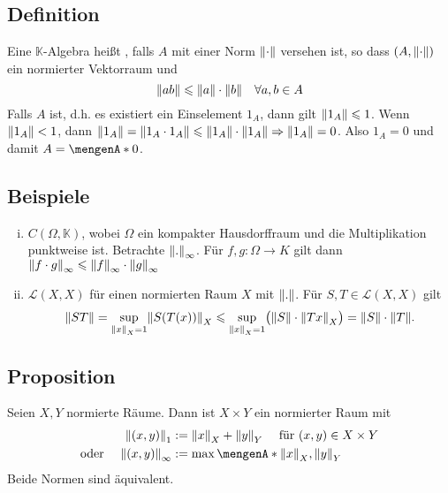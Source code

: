 \subsection[Definition: Normierte $\mathds{K}$-Algebra]{Definition} %
\label{sub:210}
Eine $\mathds{K}$-Algebra heißt , falls $A$ mit einer Norm $\norm{\cdot}$ versehen ist, so dass $(A,\norm{\cdot} )$ ein normierter Vektorraum und
\[
	\norm{a b} \le \norm{a} \cdot \norm{b} \quad \forall a,b \in A   
\]
Falls $A$  ist, d.h. es existiert ein Einselement $1_A$, dann gilt $\norm{1_A} \le 1$.
Wenn $\norm{1_A} < 1$, dann $\norm{1_A} = \norm{1_A \cdot 1_A} \le \norm{1_A} \cdot \norm{1_A} \Rightarrow \norm{1_A} =0 $. Also $1_A=0$ und damit $A= \set{0}$.

\subsection[Beispiele für normierte Algebren]{Beispiele} %
\label{sub:211}
\begin{enumerate}[(i)]
	\item $C(\Omega,\mathds{K})$, wobei $\Omega$ ein kompakter Hausdorffraum und die Multiplikation punktweise ist. Betrachte $\norm[\infty]{.}$. Für $f,g : \Omega \to K$ gilt dann
	$\norm[\infty]{f \cdot g} \le \norm[\infty]{f} \cdot \norm[\infty]{g}$
	\item $\mathcal{L}(X,X)$ für einen normierten Raum $X$ mit $\norm{.}$. Für $S,T \in \mathcal{L}(X,X)$ gilt
	\[
		\norm{S T} = \sup_{\norm[X]{x}=1} \norm[X]{S(T(x))} \le \sup_{\norm[X]{x}=1} \enbrace[\big]{\norm{S} \cdot \norm[X]{Tx}} = \norm{S} \cdot \norm{T}.     
	\]
\end{enumerate}

\subsection[Proposition: Norm auf dem Produkt normierter Räume]{Proposition} %
\label{sub:212}
Seien $X,Y$ normierte Räume. Dann ist $X \times Y$ ein normierter Raum mit 
\begin{align*}
	 \norm[1]{(x,y)} &:= \norm[X]{x} + \norm[Y]{y}   \quad \text{ für } (x,y) \in X \times Y \\
	\text{oder } \quad \norm[\infty]{(x,y)} &:= \max \set{\norm[X]{x}, \norm[Y]{y}}  
\end{align*}
Beide Normen sind äquivalent.

